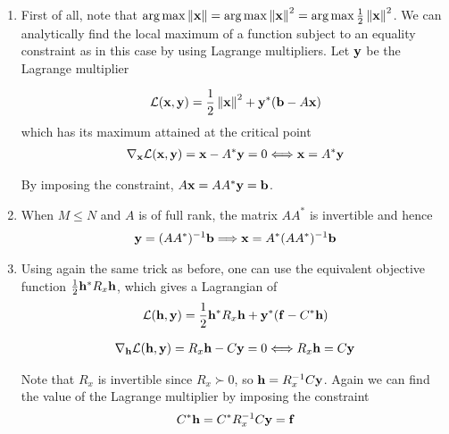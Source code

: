 \documentclass{article}
\begin{document}
\begin{enumerate}[label=(\roman*)]
    \end{enumerate}
    
    \begin{enumerate}[label=(\roman*)]
        \item First of all, note that $\operatorname*{arg\,max} \left\lVert\mathbf{x}\right\rVert=\operatorname*{arg\,max} \left\lVert\mathbf{x}\right\rVert^2 = \operatorname*{arg\,max} \frac{1}{2}\left\lVert\mathbf{x}\right\rVert^2$. We can analytically find the local maximum of a function subject to an equality constraint as in this case by using Lagrange multipliers. Let $\mathbf{y}$ be the Lagrange multiplier
        
        \begin{align}
            \mathcal{L} (\mathbf{x}, \mathbf{y}) = \frac{1}{2}\left\lVert\mathbf{x}\right\rVert^2 + \mathbf{y}^* (\mathbf{b} - A \mathbf{x})
        \end{align}
        which has its maximum attained at the critical point
        \begin{align}
            \nabla_{\mathbf{x}} \mathcal{L}(\mathbf{x}, \mathbf{y}) = \mathbf{x} - A^* \mathbf{y} = 0 \Longleftrightarrow \mathbf{x} = A^* \mathbf{y}
        \end{align}
        
        By imposing the constraint, $A\mathbf{x}= A A^* \mathbf{y}= \mathbf{b}$.
        \item When $M \leq N$ and $A$ is of full rank, the matrix $A A^*$ is invertible and hence
        \begin{align}
            \mathbf{y} = (A A^*)^{-1} \mathbf{b} \Longrightarrow \mathbf{x} = A^* (A A^*)^{-1} \mathbf{b}
        \end{align}
        \item Using again the same trick as before, one can use the equivalent objective function $\frac{1}{2}\mathbf{h}^* R_x \mathbf{h}$, which gives a Lagrangian of
        \begin{align}
             \mathcal{L} (\mathbf{h}, \mathbf{y}) = \frac{1}{2}\mathbf{h}^* R_x \mathbf{h} + \mathbf{y}^* (\mathbf{f} - C^* \mathbf{h})
        \end{align}
        
        \begin{align}
            \nabla_{\mathbf{h}} \mathcal{L}(\mathbf{h}, \mathbf{y}) = R_x \mathbf{h} - C \mathbf{y} = 0 \Longleftrightarrow R_x \mathbf{h} = C \mathbf{y}
        \end{align}
        
        Note that $R_x$ is invertible since $R_x \succ 0$, so $\mathbf{h} = R_x^{-1} C \mathbf{y}$. Again we can find the value of the Lagrange multiplier by imposing the constraint
        \begin{align}
            C^* \mathbf{h} = C^* R_x^{-1} C \mathbf{y} = \mathbf{f}
        \end{align}
        

\end{enumerate}
\end{document}
